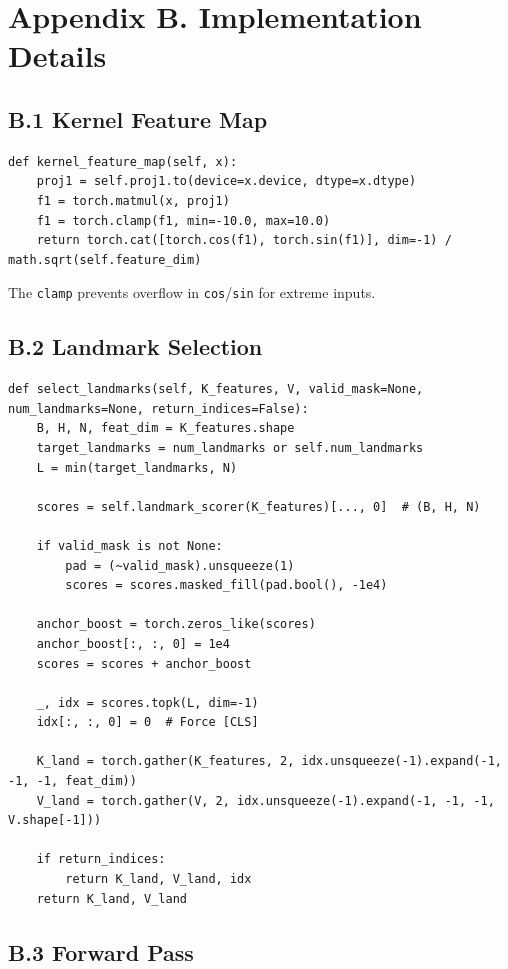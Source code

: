 \section{Appendix B. Implementation Details}

\subsection{B.1 Kernel Feature Map}

\begin{lstlisting}
def kernel_feature_map(self, x):
    proj1 = self.proj1.to(device=x.device, dtype=x.dtype)
    f1 = torch.matmul(x, proj1)
    f1 = torch.clamp(f1, min=-10.0, max=10.0)
    return torch.cat([torch.cos(f1), torch.sin(f1)], dim=-1) / math.sqrt(self.feature_dim)
\end{lstlisting}

The \texttt{clamp} prevents overflow in \texttt{cos}/\texttt{sin} for extreme inputs.

\subsection{B.2 Landmark Selection}

\begin{lstlisting}
def select_landmarks(self, K_features, V, valid_mask=None, num_landmarks=None, return_indices=False):
    B, H, N, feat_dim = K_features.shape
    target_landmarks = num_landmarks or self.num_landmarks
    L = min(target_landmarks, N)
    
    scores = self.landmark_scorer(K_features)[..., 0]  # (B, H, N)
    
    if valid_mask is not None:
        pad = (~valid_mask).unsqueeze(1)
        scores = scores.masked_fill(pad.bool(), -1e4)
    
    anchor_boost = torch.zeros_like(scores)
    anchor_boost[:, :, 0] = 1e4
    scores = scores + anchor_boost
    
    _, idx = scores.topk(L, dim=-1)
    idx[:, :, 0] = 0  # Force [CLS]
    
    K_land = torch.gather(K_features, 2, idx.unsqueeze(-1).expand(-1, -1, -1, feat_dim))
    V_land = torch.gather(V, 2, idx.unsqueeze(-1).expand(-1, -1, -1, V.shape[-1]))
    
    if return_indices:
        return K_land, V_land, idx
    return K_land, V_land
\end{lstlisting}

\subsection{B.3 Forward Pass}

